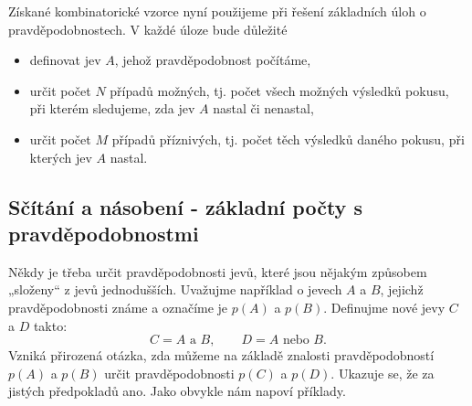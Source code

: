       
      
      Získané kombinatorické vzorce nyní použijeme při řešení základních úloh o pravděpodobnostech. 
      V každé úloze bude důležité
      \begin{itemize}
        \item definovat jev \(A\), jehož pravděpodobnost počítáme,
        \item určit počet \(N\) případů možných, tj. počet všech možných výsledků pokusu, při 
              kterém sledujeme, zda jev \(A\) nastal či nenastal,
        \item určit počet \(M\) případů příznivých, tj. počet těch výsledků daného pokusu, při 
              kterých jev \(A\) nastal.
      \end{itemize}

      

      

      

    \subsection{Sčítání a násobení - základní počty s pravděpodobnostmi}
      Někdy je třeba určit pravděpodobnosti jevů, které jsou nějakým způsobem „složeny“ z jevů
      jednodušších. Uvažujme například o jevech \(A\) a \(B\), jejichž pravděpodobnosti známe a 
      označíme je \(p(A)\) a \(p(B)\). Definujme nové jevy \(C\) a \(D\) takto:
      \begin{equation*}
        C = A \text{ a } B, \qquad D = A \text{ nebo } B.
      \end{equation*}
      Vzniká přirozená otázka, zda můžeme na základě znalosti pravděpodobností \(p(A)\) a \(p(B)\) 
      určit pravděpodobnosti \(p(C)\) a \(p(D)\). Ukazuje se, že za jistých předpokladů ano. Jako 
      obvykle nám napoví příklady.

